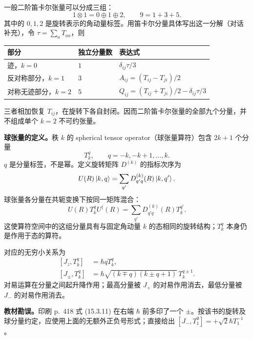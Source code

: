 一般二阶笛卡尔张量可以分成三组：
\begin{equation}
  \boxed{1\otimes1=0\oplus1\oplus2,\qquad 9=1+3+5.}
\end{equation}
其中的 $0,1,2$ 是旋转表示的角动量标签。用笛卡尔分量具体写出这一分解（对话补充），令 $\tau=\sum_aT_{aa}$，则
\begin{center}
\begin{tabularx}{\textwidth}{@{}llX@{}}
  \toprule
  部分 & 独立分量数 & 表达式 \\
  \midrule
  迹，$k=0$ & $1$ & $\delta_{ij}\tau/3$ \\
  反对称部分，$k=1$ & $3$ & $A_{ij}=(T_{ij}-T_{ji})/2$ \\
  对称无迹部分，$k=2$ & $5$ & $Q_{ij}=(T_{ij}+T_{ji})/2-\delta_{ij}\tau/3$ \\
  \bottomrule
\end{tabularx}
\end{center}
三者相加恢复 $T_{ij}$，在旋转下各自封闭。因而二阶笛卡尔张量的全部九个分量，并不组成单个 $k=2$ 不可约张量。

\textbf{球张量的定义。}秩 $k$ 的 spherical tensor operator（球张量算符）包含 $2k+1$ 个分量
\begin{equation}
  T_k^q,\qquad q=-k,-k+1,\ldots,k.
\end{equation}
$q$ 是分量标签，不是幂。定义旋转矩阵 $D^{(k)}$ 的指标次序为
\begin{equation}
  U(R)\left|k,q\right\rangle=\sum_{q'}D^{(k)}_{q'q}(R)\left|k,q'\right\rangle.
\end{equation}
球张量各分量在共轭变换下按同一矩阵混合：
\begin{equation}
  \boxed{U(R)T_k^qU^\dagger(R)
    =\sum_{q'}D^{(k)}_{q'q}(R)T_k^{q'}.}
\end{equation}
这使算符空间中的这组分量具有与固定角动量 $k$ 的态相同的旋转结构；$T_k^q$ 本身仍是作用于态的算符。

对应的无穷小关系为
\begin{equation}
  \boxed{\begin{aligned}
    [J_z,T_k^q]&=\hbar qT_k^q,\\
    [J_\pm,T_k^q]&=\hbar\sqrt{(k\mp q)(k\pm q+1)}\,T_k^{q\pm1}.
  \end{aligned}}
\end{equation}
对易运算在分量之间起升降作用；最高分量被 $J_+$ 的对易作用消去，最低分量被 $J_-$ 的对易作用消去。

\textbf{教材勘误。}印刷 p.~418 式 (15.3.11) 在右端 $\hbar$ 前多印了一个 $\pm$。按该书的旋转及球分量约定，应使用上面的无额外正负号形式；直接给出 $[J_-,T_1^0]=+\sqrt2\hbar T_1^{-1}$。

